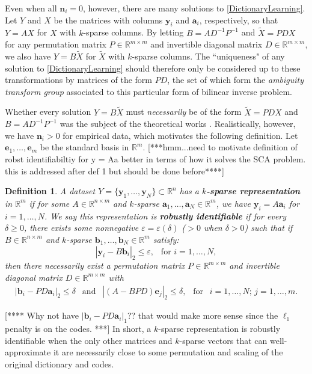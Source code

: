 \documentclass[journal, onecolumn]{IEEEtran}
\newtheorem{definition}{Definition}
\begin{document}
Even when all $\mathbf{n}_i = 0$, however, there are many solutions to \eqref{DictionaryLearning}. Let $Y$ and $X$ be the matrices with columns $\mathbf{y}_i$ and $\mathbf{a}_i$, respectively, so that $Y = AX$ for $X$ with $k$-sparse columns. By letting $B = AD^{-1}P^{-1}$ and $\tilde X = PDX$ for any permutation matrix $P \in \mathbb{R}^{m \times m}$ and invertible diagonal matrix $D \in \mathbb{R}^{m \times m}$, we also have $Y = B \tilde X$ for $\tilde X$ with $k$-sparse columns. The ``uniqueness" of any solution to \eqref{DictionaryLearning} should therefore only be considered up to these transformations by matrices of the form $PD$, the set of which form the \emph{ambiguity transform group} \cite{?} associated to this particular form of bilinear inverse problem. 

Whether every solution $Y = B \tilde X$ must \emph{necessarily} be of the form $\tilde X = PDX$ and $B = AD^{-1}P^{-1}$ was the subject of the theoretical works \cite{Georgiev05, Aharon06, Hillar15}.  
Realistically, however, we have $\mathbf{n}_i > 0$ for empirical data, which motivates the following definition. Let $\mathbf{e}_1, \ldots, \mathbf{e}_m$ be the standard basis in $\mathbb{R}^m$. [***hmm...need to motivate definition of robst identifiabiltiy for y = Aa better in terms of how it solves the SCA problem. this is addressed after def 1 but should be done before****]

\begin{definition}\label{Uniqueness}
A dataset $Y = \{\mathbf{y}_1, \ldots, \mathbf{y}_N\} \subset \mathbb{R}^n$ has a \textbf{$k$-sparse representation} in $\mathbb{R}^m$ if for some $A \in \mathbb{R}^{n \times m}$ and $k$-sparse $\mathbf{a}_1, \ldots, \mathbf{a}_N \in \mathbb{R}^m$, we have $\mathbf{y}_i = A\mathbf{a}_i$ for $i = 1, \ldots, N$. We say this representation is \textbf{robustly identifiable} if for every $\delta \geq 0$, there exists some nonnegative $\varepsilon = \varepsilon(\delta)$ ($> 0$ when $\delta > 0$) such that if $B \in \mathbb{R}^{n \times m}$ and $k$-sparse $\mathbf{b}_1, \ldots, \mathbf{b}_N \in \mathbb{R}^m$ satisfy:
\[|\mathbf{y}_i - B\mathbf{b}_i|_2 \leq \varepsilon, \ \ \text{ for } i = 1, \ldots, N,\]
%
then there necessarily exist a permutation matrix $P \in \mathbb{R}^{m \times m}$ and invertible diagonal matrix $D \in \mathbb{R}^{m \times m}$ with
\begin{align}\label{def1}
|\mathbf{b}_i - PD\mathbf{a}_i|_2 \leq \delta \ \ \text{ and } \ \ |(A - BPD)\mathbf{e}_j|_2 \leq \delta, \ \ \text{ for } \ \ i = 1, \ldots, N; \, j = 1, \ldots, m.
\end{align}
\end{definition}
[**** Why not have $|\mathbf{b}_i - PD\mathbf{a}_i|_1$??  that would make more sense since the $\ell_1$ penalty is on the codes.  ***]
In short, a $k$-sparse representation is robustly identifiable when the only other matrices and $k$-sparse vectors that can well-approximate it are necessarily close to some permutation and scaling of the original dictionary and codes.
\end{document}
